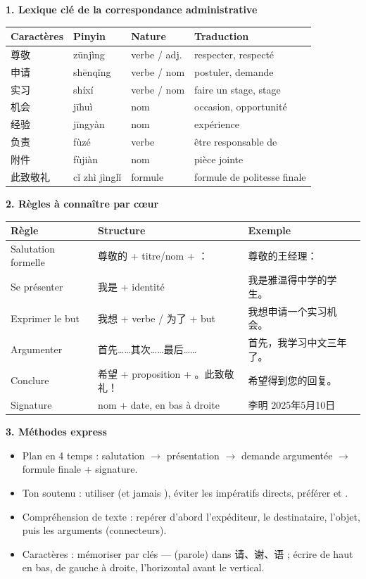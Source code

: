 \documentclass[11pt]{article}
\newcommand{\cle}[1]{{\popxbold\color{popdark}#1}}
\newcommand{\zh}[1]{\ifmmode\text{#1}\else{#1}\fi}
\begin{document}
\begin{bilan}
\textbf{1. Lexique clé de la correspondance administrative}
\begin{center}
\begin{tabularx}{\linewidth}{|X|X|X|X|}
\hline
\rowcolor{popblueL} Caractères & Pinyin & Nature & Traduction \\
\hline
尊敬 & zūnjìng & verbe / adj. & respecter, respecté \\
\hline
申请 & shēnqǐng & verbe / nom & postuler, demande \\
\hline
实习 & shíxí & verbe / nom & faire un stage, stage \\
\hline
机会 & jīhuì & nom & occasion, opportunité \\
\hline
经验 & jīngyàn & nom & expérience \\
\hline
负责 & fùzé & verbe & être responsable de \\
\hline
附件 & fùjiàn & nom & pièce jointe \\
\hline
此致敬礼 & cǐ zhì jìnglǐ & formule & formule de politesse finale \\
\hline
\end{tabularx}
\end{center}

\textbf{2. Règles à connaître par cœur}
\begin{center}
\begin{tabularx}{\linewidth}{|X|X|X|}
\hline
\rowcolor{popblueL} Règle & Structure & Exemple \\
\hline
Salutation formelle & 尊敬的 + titre/nom + ： & 尊敬的王经理： \\
\hline
Se présenter & 我是 + identité & 我是雅温得中学的学生。 \\
\hline
Exprimer le but & 我想 + verbe / 为了 + but & 我想申请一个实习机会。 \\
\hline
Argumenter & 首先……其次……最后…… & 首先，我学习中文三年了。 \\
\hline
Conclure & 希望 + proposition + 。此致敬礼！ & 希望得到您的回复。 \\
\hline
Signature & nom + date, en bas à droite & 李明 2025年5月10日 \\
\hline
\end{tabularx}
\end{center}

\textbf{3. Méthodes express}
\begin{itemize}
\item \cle{Plan en 4 temps} : salutation $\rightarrow$ présentation $\rightarrow$ demande argumentée $\rightarrow$ formule finale + signature.
\item \cle{Ton soutenu} : utiliser \zh{您} (et jamais \zh{你}), éviter les impératifs directs, préférer \zh{希望} et \zh{请}.
\item \cle{Compréhension de texte} : repérer d'abord l'expéditeur, le destinataire, l'objet, puis les arguments (connecteurs).
\item \cle{Caractères} : mémoriser par clés — \zh{讠} (parole) dans 请、谢、语 ; écrire de haut en bas, de gauche à droite, l'horizontal avant le vertical.
\end{itemize}
\end{bilan}
\end{document}
